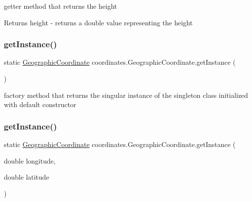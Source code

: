 getter method that returns the height 

\begin{DoxyReturn}{Returns}
height -\/ returns a double value representing the height 
\end{DoxyReturn}
\mbox{\label{classcoordinates_1_1_geographic_coordinate_a16664e43964dee1be65e978904315266}} 
\subsubsection{\texorpdfstring{get\+Instance()}{getInstance()}\hspace{0.1cm}{\footnotesize\ttfamily [1/3]}}
{\footnotesize\ttfamily static \hyperlink{classcoordinates_1_1_geographic_coordinate}{Geographic\+Coordinate} coordinates.\+Geographic\+Coordinate.\+get\+Instance (\begin{DoxyParamCaption}{ }\end{DoxyParamCaption})\hspace{0.3cm}{\ttfamily [static]}}



factory method that returns the singular instance of the singleton class initialized with default constructor 

\mbox{\label{classcoordinates_1_1_geographic_coordinate_a29ced8017420b012f7bd5749ed6ba600}} 
\subsubsection{\texorpdfstring{get\+Instance()}{getInstance()}\hspace{0.1cm}{\footnotesize\ttfamily [2/3]}}
{\footnotesize\ttfamily static \hyperlink{classcoordinates_1_1_geographic_coordinate}{Geographic\+Coordinate} coordinates.\+Geographic\+Coordinate.\+get\+Instance (\begin{DoxyParamCaption}\item[{double}]{longitude,  }\item[{double}]{latitude }\end{DoxyParamCaption})\hspace{0.3cm}{\ttfamily [static]}}



